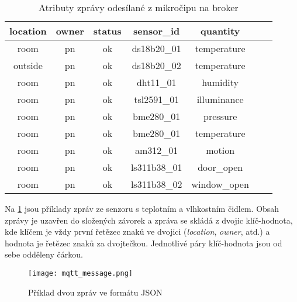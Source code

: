 \begin{table}[h]
\centering
 \begin{tabular}{|c|c|c|c|c|c|c|} 
 \hline
  location & owner & status & sensor\_id & quantity  \\
 \hline\hline
 room & pn & ok & ds18b20\_01 & temperature \\ 
 outside & pn & ok & ds18b20\_02 & temperature \\
 room & pn & ok & dht11\_01 & humidity \\
 room & pn & ok & tsl2591\_01 & illuminance \\
 room & pn & ok & bme280\_01 & pressure \\
 room & pn & ok & bme280\_01 & temperature \\
 room & pn & ok & am312\_01 & motion \\
 room & pn & ok & ls311b38\_01 & door\_open \\
 room & pn & ok & ls311b38\_02 & window\_open \\
 \hline
 \end{tabular}
 \caption{Atributy zprávy odesílané z mikročipu na broker}
 \label{tab:mqtt_msg_structure}
\end{table}

Na \cref{fig:mqtt_message} jsou příklady zpráv ze senzoru s teplotním a vlhkostním čidlem. Obsah zprávy je uzavřen do složených závorek a zpráva se skládá z dvojic klíč-hodnota, kde klíčem je vždy první řetězec znaků ve dvojici (\textit{location}, \textit{owner}, atd.) a hodnota je řetězec znaků za dvojtečkou. Jednotlivé páry klíč-hodnota jsou od sebe odděleny čárkou.

\begin{figure}[H]
  \centering
  \texttt{[image: mqtt\_message.png]}
  \caption{Příklad dvou zpráv ve formátu JSON}
  \label{fig:mqtt_message}
\end{figure}

